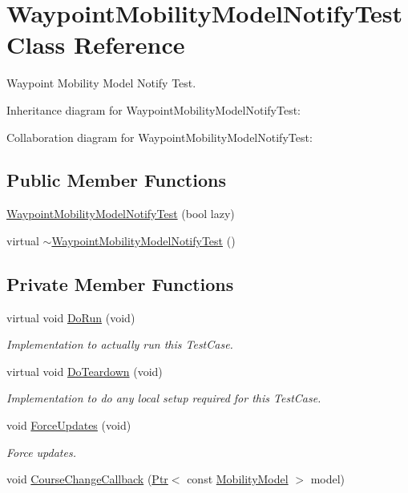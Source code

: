 \hypertarget{classWaypointMobilityModelNotifyTest}{}\section{Waypoint\+Mobility\+Model\+Notify\+Test Class Reference}
\label{classWaypointMobilityModelNotifyTest}


Waypoint Mobility Model Notify Test.  




Inheritance diagram for Waypoint\+Mobility\+Model\+Notify\+Test\+:


Collaboration diagram for Waypoint\+Mobility\+Model\+Notify\+Test\+:
\subsection*{Public Member Functions}
\begin{DoxyCompactItemize}
\item 
\hyperlink{classWaypointMobilityModelNotifyTest_a91ddbc02e2b939982a737d6d10e6b7ba}{Waypoint\+Mobility\+Model\+Notify\+Test} (bool lazy)
\item 
virtual \hyperlink{classWaypointMobilityModelNotifyTest_a8c5e5c5a0d88466be07da4bb15c0f315}{$\sim$\+Waypoint\+Mobility\+Model\+Notify\+Test} ()
\end{DoxyCompactItemize}
\subsection*{Private Member Functions}
\begin{DoxyCompactItemize}
\item 
virtual void \hyperlink{classWaypointMobilityModelNotifyTest_a3806dd9c9361141fade8ce51021e33ff}{Do\+Run} (void)
\begin{DoxyCompactList}\small\item\em Implementation to actually run this Test\+Case. \end{DoxyCompactList}\item 
virtual void \hyperlink{classWaypointMobilityModelNotifyTest_a321cf64e6df362efd7f41bc65a918510}{Do\+Teardown} (void)
\begin{DoxyCompactList}\small\item\em Implementation to do any local setup required for this Test\+Case. \end{DoxyCompactList}\item 
void \hyperlink{classWaypointMobilityModelNotifyTest_a9c2a34515426999050c01536816f12aa}{Force\+Updates} (void)
\begin{DoxyCompactList}\small\item\em Force updates. \end{DoxyCompactList}\item 
void \hyperlink{classWaypointMobilityModelNotifyTest_a146ca98a4f7fa10d3b5d22f496f62641}{Course\+Change\+Callback} (\hyperlink{classns3_1_1Ptr}{Ptr}$<$ const \hyperlink{classns3_1_1MobilityModel}{Mobility\+Model} $>$ model)
\end{DoxyCompactItemize}

